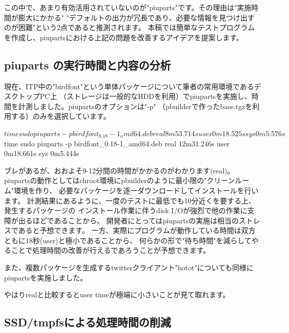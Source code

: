 \documentclass[mingoth,a4paper,twoside]{jsarticle}
\begin{document}
この中で、あまり有効活用されていないのが"piuparts"です。その理由は"実施時間が膨大にかかる"
"デフォルトの出力が冗長であり、必要な情報を見つけ出すのが困難"という2点であると推測されます。
本稿では簡単なテストプログラムを作成し、piupartsにおける上記の問題を改善するアイデアを提案します。

\subsection{piuparts の実行時間と内容の分析}

現在、ITP中の"birdfont"という単体パッケージについて筆者の常用環境であるデスクトップPC上
（ストレージは一般的なHDDを利用）でpiupartsを実施し、時間を計測しました。piupartsのオプションは"-p"
（pbuilderで作ったbase.tgzを利用する）のみを選択しています。

\begin{commandline}
$ time sudo piuparts -p birdfont_0.18-1_amd64.deb
real 8m53.714s
user 0m18.525s
sys  0m5.576s

$ time sudo piuparts -p birdfont_0.18-1_amd64.deb
real 12m31.246s
user 0m18.661s
sys  0m5.444s
\end{commandline}

ブレがあるが、おおよそ9-12分間の時間がかかるのがわかります(real)。
piupartsの動作としてはchroot環境にpbuilderのように最小限の"クリーンルーム"環境を作り、
必要なパッケージを逐一ダウンロードしてインストールを行います。
計測結果にあるように、一度のテストに最低でも10分近くを要する上、発生するパッケージの
インストール作業に伴うdisk I/Oが強烈で他の作業に支障が出るほどであることから、
開発者にとってはpiupartsの実施は相当のストレスであると予想できます。
一方、実際にプログラムが動作している時間は双方ともに18秒(user)と極小であることから、
何らかの形で"待ち時間"を減らしてやることで処理時間の改善が行えるであろうことが予想できます。

また、複数パッケージを生成するtwitterクライアント"hotot"についても同様にpiupartsを実施しました。


やはりrealと比較するとuser timeが極端に小さいことが見て取れます。

\subsection{SSD/tmpfsによる処理時間の削減}
\end{document}
